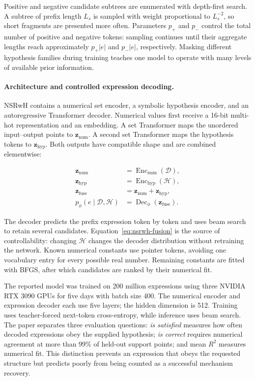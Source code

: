 Positive and negative candidate subtrees are enumerated with depth-first
search. A subtree of prefix length $L_s$ is sampled with weight proportional
to $L_s^{-2}$, so short fragments are presented more often. Parameters
$p_{+}$ and $p_{-}$ control the total number of positive and negative tokens:
sampling continues until their aggregate lengths reach approximately
$p_{+}|e|$ and $p_{-}|e|$, respectively. Masking different hypothesis families
during training teaches one model to operate with many levels of available
prior information.

\paragraph{Architecture and controlled expression decoding.}
NSRwH contains a numerical set encoder, a symbolic hypothesis encoder, and an
autoregressive Transformer decoder. Numerical values first receive a 16-bit
multi-hot representation and an embedding. A set Transformer maps the
unordered input--output points to $\mathbf z_{\mathrm{num}}$. A second set
Transformer maps the hypothesis tokens to $\mathbf z_{\mathrm{hyp}}$. Both
outputs have compatible shape and are combined elementwise:

\begin{equation}
\begin{aligned}
\mathbf z_{\mathrm{num}}&=\operatorname{Enc}_{\mathrm{num}}(\mathcal D),\\
\mathbf z_{\mathrm{hyp}}&=\operatorname{Enc}_{\mathrm{hyp}}(\mathcal H),\\
\mathbf z_{\mathrm{fuse}}&=
    \mathbf z_{\mathrm{num}}+\mathbf z_{\mathrm{hyp}},\\
p_{\phi}(e\mid\mathcal D,\mathcal H)
    &=\operatorname{Dec}_{\phi}(\mathbf z_{\mathrm{fuse}}).
\end{aligned}
\label{eq:nsrwh-fusion}
\end{equation}

The decoder predicts the prefix expression token by token and uses beam search
to retain several candidates. Equation~\eqref{eq:nsrwh-fusion} is the source of
controllability: changing $\mathcal H$ changes the decoder distribution without
retraining the network. Known numerical constants use pointer tokens, avoiding
one vocabulary entry for every possible real number. Remaining constants are
fitted with BFGS, after which candidates are ranked by their numerical fit.

The reported model was trained on 200 million expressions using three NVIDIA
RTX 3090 GPUs for five days with batch size 400. The numerical encoder and
expression decoder each use five layers; the hidden dimension is 512. Training
uses teacher-forced next-token cross-entropy, while inference uses beam search.
The paper separates three evaluation questions: \emph{is satisfied} measures
how often decoded expressions obey the supplied hypothesis; \emph{is correct}
requires numerical agreement at more than 99\% of held-out support points; and
mean $R^2$ measures numerical fit. This distinction prevents an expression that
obeys the requested structure but predicts poorly from being counted as a
successful mechanism recovery.

